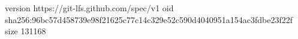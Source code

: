 version https://git-lfs.github.com/spec/v1
oid sha256:96bc57d458739e98f21625c77c14c329e52c590d4040951a154ac3fdbe23f22f
size 131168
